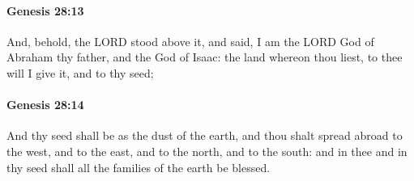 		\paragraph{Genesis 28:13} %
			\label{GENESIS-28-13}

			And, behold, the LORD stood above it, and said, I am the LORD God of Abraham thy father, and the God of Isaac: the land whereon thou liest, to thee will I give it, and to thy seed;


		\paragraph{Genesis 28:14} %
			\label{GENESIS-28-14}

			And thy seed shall be as the dust of the earth, and thou shalt spread abroad to the west, and to the east, and to the north, and to the south: and in thee and in thy seed shall all the families of the earth be blessed.

